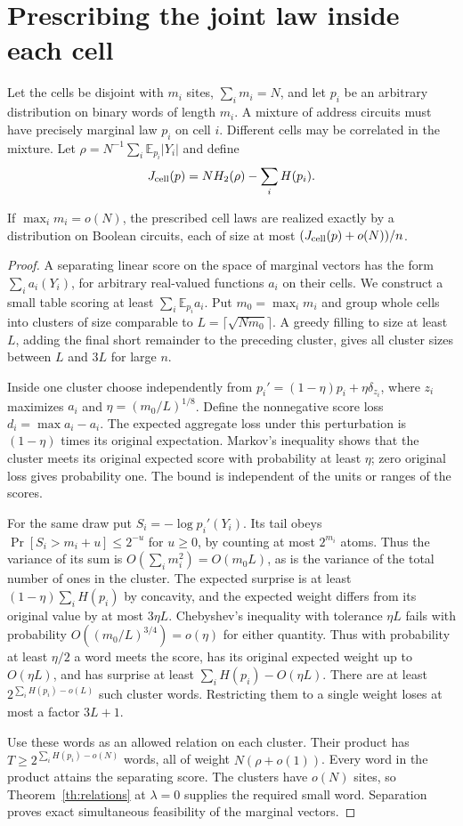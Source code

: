 \section{Prescribing the joint law inside each cell}
Let the cells be disjoint with $m_i$ sites, $\sum_i m_i=N$, and let $p_i$ be an arbitrary distribution on binary words of length $m_i$. A mixture of address circuits must have precisely marginal law $p_i$ on cell $i$. Different cells may be correlated in the mixture. Let $\rho=N^{-1}\sum_i\mathbb E_{p_i}|Y_i|$ and define
\[
 J_{\rm cell}(p)=N H_2(\rho)-\sum_i H(p_i).
\]
\begin{theorem}\label{th:cellmix}
If $\max_i m_i=o(N)$, the prescribed cell laws are realized exactly by a distribution on Boolean circuits, each of size at most $(J_{\rm cell}(p)+o(N))/n$.
\end{theorem}
\begin{proof}
A separating linear score on the space of marginal vectors has the form $\sum_i a_i(Y_i)$, for arbitrary real-valued functions $a_i$ on their cells. We construct a small table scoring at least $\sum_i\mathbb E_{p_i}a_i$. Put $m_0=\max_i m_i$ and group whole cells into clusters of size comparable to $L=\lceil\sqrt{Nm_0}\rceil$. A greedy filling to size at least $L$, adding the final short remainder to the preceding cluster, gives all cluster sizes between $L$ and $3L$ for large $n$.

Inside one cluster choose independently from $p_i'=(1-\eta)p_i+\eta\delta_{z_i}$, where $z_i$ maximizes $a_i$ and $\eta=(m_0/L)^{1/8}$. Define the nonnegative score loss $d_i=\max a_i-a_i$. The expected aggregate loss under this perturbation is $(1-\eta)$ times its original expectation. Markov's inequality shows that the cluster meets its original expected score with probability at least $\eta$; zero original loss gives probability one. The bound is independent of the units or ranges of the scores.

For the same draw put $S_i=-\log p_i'(Y_i)$. Its tail obeys $\Pr[S_i>m_i+u]\le2^{-u}$ for $u\ge0$, by counting at most $2^{m_i}$ atoms. Thus the variance of its sum is $O(\sum_i m_i^2)=O(m_0L)$, as is the variance of the total number of ones in the cluster. The expected surprise is at least $(1-\eta)\sum_i H(p_i)$ by concavity, and the expected weight differs from its original value by at most $3\eta L$. Chebyshev's inequality with tolerance $\eta L$ fails with probability $O((m_0/L)^{3/4})=o(\eta)$ for either quantity. Thus with probability at least $\eta/2$ a word meets the score, has its original expected weight up to $O(\eta L)$, and has surprise at least $\sum_i H(p_i)-O(\eta L)$. There are at least $2^{\sum_i H(p_i)-o(L)}$ such cluster words. Restricting them to a single weight loses at most a factor $3L+1$.

Use these words as an allowed relation on each cluster. Their product has $T\ge2^{\sum_i H(p_i)-o(N)}$ words, all of weight $N(\rho+o(1))$. Every word in the product attains the separating score. The clusters have $o(N)$ sites, so Theorem~\ref{th:relations} at $\lambda=0$ supplies the required small word. Separation proves exact simultaneous feasibility of the marginal vectors.
\end{proof}


